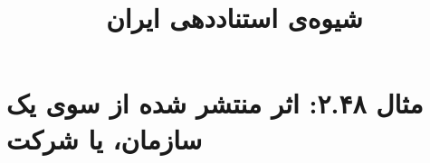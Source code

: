 \documentclass[a4paper,10pt]{article}
\begin{document}
\title{شیوه‌ی استناددهی ایران
 }
\author{}
\date{}
\maketitle



\section*{مثال ۲.۴۸: اثر منتشر شده از سوی یک سازمان، یا شرکت}

\cite{برنامه1380}\\
\cite{هما1375}\\
\cite{bsi1985}\\
\cite{iso690-2}\\






\end{document}
